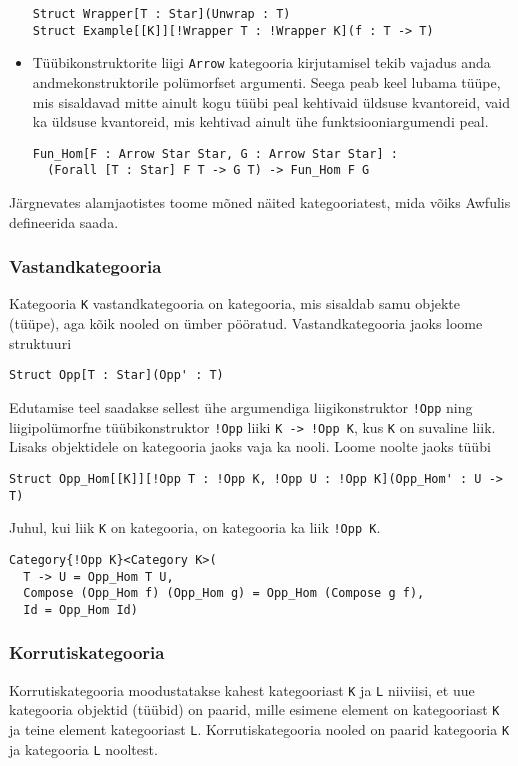 \documentclass[12pt]{article}
\begin{document}
\begin{itemize}
            \begin{verbatim}Struct Wrapper[T : Star](Unwrap : T)
Struct Example[[K]][!Wrapper T : !Wrapper K](f : T -> T)\end{verbatim}
          \item
            Tüübikonstruktorite liigi \verb!Arrow! kategooria kirjutamisel tekib vajadus anda andmekonstruktorile polümorfset argumenti. Seega peab keel lubama tüüpe, mis sisaldavad mitte ainult kogu tüübi peal kehtivaid üldsuse kvantoreid, vaid ka üldsuse kvantoreid, mis kehtivad ainult ühe funktsiooniargumendi peal.

            \begin{verbatim}Fun_Hom[F : Arrow Star Star, G : Arrow Star Star] :
  (Forall [T : Star] F T -> G T) -> Fun_Hom F G\end{verbatim}
        \end{itemize}

        Järgnevates alamjaotistes toome mõned näited kategooriatest, mida võiks Awfulis defineerida saada.
      \subsubsection{Vastandkategooria}
        Kategooria \verb!K! vastandkategooria on kategooria, mis sisaldab samu objekte (tüüpe), aga kõik nooled on ümber pööratud. Vastandkategooria jaoks loome struktuuri

        \begin{verbatim}Struct Opp[T : Star](Opp' : T)\end{verbatim}

        Edutamise teel saadakse sellest ühe argumendiga liigikonstruktor \verb"!Opp" ning liigipolümorfne tüübikonstruktor \verb"!Opp" liiki \verb"K -> !Opp K", kus \verb!K! on suvaline liik. Lisaks objektidele on kategooria jaoks vaja ka nooli. Loome noolte jaoks tüübi

        \begin{verbatim}Struct Opp_Hom[[K]][!Opp T : !Opp K, !Opp U : !Opp K](Opp_Hom' : U -> T)\end{verbatim}

        Juhul, kui liik \verb!K! on kategooria, on kategooria ka liik \verb"!Opp K".

        \begin{verbatim}Category{!Opp K}<Category K>(
  T -> U = Opp_Hom T U,
  Compose (Opp_Hom f) (Opp_Hom g) = Opp_Hom (Compose g f),
  Id = Opp_Hom Id)\end{verbatim}
      \subsubsection{Korrutiskategooria}
        Korrutiskategooria moodustatakse kahest kategooriast \verb!K! ja \verb!L! niiviisi, et uue kategooria objektid (tüübid) on paarid, mille esimene element on kategooriast \verb!K! ja teine element kategooriast \verb!L!. Korrutiskategooria nooled on paarid kategooria \verb!K! ja kategooria \verb!L! nooltest.
\end{document}
